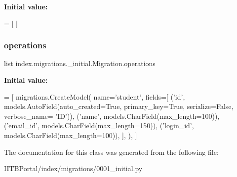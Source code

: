 {\bfseries Initial value\+:}
\begin{DoxyCode}
=  [
    ]
\end{DoxyCode}
\mbox{\label{classindex_1_1migrations_1_10001__initial_1_1Migration_a2a029e70736e2fefa2ddeabe296c104e}} 
\subsubsection{\texorpdfstring{operations}{operations}}
{\footnotesize\ttfamily list index.\+migrations.\+\_\+initial.\+Migration.\+operations\hspace{0.3cm}{\ttfamily [static]}}

{\bfseries Initial value\+:}
\begin{DoxyCode}
=  [
        migrations.CreateModel(
            name=\textcolor{stringliteral}{'student'},
            fields=[
                (\textcolor{stringliteral}{'id'}, models.AutoField(auto\_created=\textcolor{keyword}{True}, primary\_key=\textcolor{keyword}{True}, serialize=\textcolor{keyword}{False}, verbose\_name=\textcolor{stringliteral}{
      'ID'})),
                (\textcolor{stringliteral}{'name'}, models.CharField(max\_length=100)),
                (\textcolor{stringliteral}{'email\_id'}, models.CharField(max\_length=150)),
                (\textcolor{stringliteral}{'login\_id'}, models.CharField(max\_length=100)),
            ],
        ),
    ]
\end{DoxyCode}


The documentation for this class was generated from the following file\+:\begin{DoxyCompactItemize}
\item 
I\+I\+T\+B\+Portal/index/migrations/0001\+\_\+initial.\+py\end{DoxyCompactItemize}
